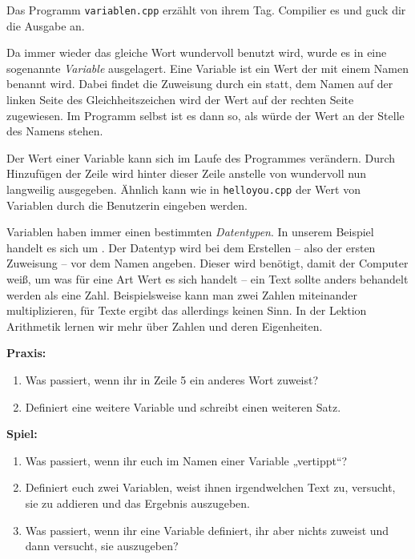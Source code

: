 
Das Programm \texttt{variablen.cpp} erzählt von ihrem Tag.
Compilier es und guck dir die Ausgabe an.


Da immer wieder das gleiche Wort \glqq{}wundervoll\grqq{} benutzt wird, wurde es in eine sogenannte \emph{Variable} ausgelagert.
Eine Variable ist ein Wert der mit einem Namen benannt wird.
Dabei findet die Zuweisung durch ein \cppinline{=} statt, dem Namen auf der linken Seite des Gleichheitszeichen wird der Wert auf der rechten Seite zugewiesen.
Im Programm selbst ist es dann so, als würde der Wert an der Stelle des Namens stehen.

Der Wert einer Variable kann sich im Laufe des Programmes verändern.
Durch Hinzufügen der Zeile  wird hinter dieser Zeile anstelle von \glqq{}wundervoll\grqq{} nun \glqq{}langweilig\grqq{} ausgegeben.
Ähnlich kann wie in \texttt{helloyou.cpp} der Wert von Variablen durch  die Benutzerin eingeben werden.

Variablen haben immer einen bestimmten \emph{Datentypen}.
In unserem Beispiel handelt es sich um .
Der Datentyp wird bei dem Erstellen -- also der ersten Zuweisung -- vor dem Namen angeben.
Dieser wird benötigt, damit der Computer weiß, um was für eine Art Wert es sich handelt -- ein Text sollte anders behandelt werden als eine Zahl.
Beispielsweise kann man zwei Zahlen miteinander multiplizieren, für Texte ergibt das allerdings keinen Sinn.
In der Lektion Arithmetik lernen wir mehr über Zahlen und deren Eigenheiten.

\textbf{Praxis:}
\begin{enumerate}
    \item Was passiert, wenn ihr  in Zeile 5 ein anderes Wort zuweist?
    \item Definiert eine weitere Variable und schreibt einen weiteren Satz.
\end{enumerate}

\textbf{Spiel:}
\begin{enumerate}
    \item Was passiert, wenn ihr euch im Namen einer Variable „vertippt“?
    \item Definiert euch zwei  Variablen, weist ihnen
        irgendwelchen Text zu, versucht, sie zu addieren und das Ergebnis auszugeben.
    \item Was passiert, wenn ihr eine  Variable definiert,
        ihr aber nichts zuweist und dann versucht, sie auszugeben?
\end{enumerate}
